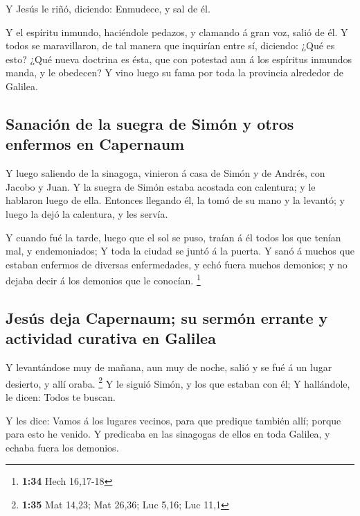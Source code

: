  Y Jesús le riñó, diciendo: Enmudece, y sal de él.

 Y el espíritu inmundo, haciéndole pedazos, y clamando á
gran voz, salió de él.  Y todos se maravillaron, de tal
manera que inquirían entre sí, diciendo: ¿Qué es esto? ¿Qué nueva
doctrina es ésta, que con potestad aun á los espíritus inmundos manda, y
le obedecen?  Y vino luego su fama por toda la provincia
alrededor de Galilea.

\hypertarget{sanaciuxf3n-de-la-suegra-de-simuxf3n-y-otros-enfermos-en-capernaum}{%
\subsection{Sanación de la suegra de Simón y otros enfermos en
Capernaum}\label{sanaciuxf3n-de-la-suegra-de-simuxf3n-y-otros-enfermos-en-capernaum}}

 Y luego saliendo de la sinagoga, vinieron á casa de
Simón y de Andrés, con Jacobo y Juan.  Y la suegra de
Simón estaba acostada con calentura; y le hablaron luego de ella.
 Entonces llegando él, la tomó de su mano y la levantó; y
luego la dejó la calentura, y les servía.

 Y cuando fué la tarde, luego que el sol se puso, traían
á él todos los que tenían mal, y endemoniados;  Y toda la
ciudad se juntó á la puerta.  Y sanó á muchos que estaban
enfermos de diversas enfermedades, y echó fuera muchos demonios; y no
dejaba decir á los demonios que le conocían. \footnote{\textbf{1:34}
  Hech 16,17-18}

\hypertarget{jesuxfas-deja-capernaum-su-sermuxf3n-errante-y-actividad-curativa-en-galilea}{%
\subsection{Jesús deja Capernaum; su sermón errante y actividad curativa
en
Galilea}\label{jesuxfas-deja-capernaum-su-sermuxf3n-errante-y-actividad-curativa-en-galilea}}

 Y levantándose muy de mañana, aun muy de noche, salió y
se fué á un lugar desierto, y allí oraba. \footnote{\textbf{1:35} Mat
  14,23; Mat 26,36; Luc 5,16; Luc 11,1}  Y le siguió
Simón, y los que estaban con él;  Y hallándole, le dicen:
Todos te buscan.

 Y les dice: Vamos á los lugares vecinos, para que
predique también allí; porque para esto he venido.  Y
predicaba en las sinagogas de ellos en toda Galilea, y echaba fuera los
demonios.

